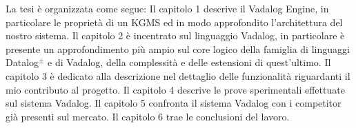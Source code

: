 La tesi è organizzata come segue: \newline \newline
Il capitolo 1 descrive il Vadalog Engine, in particolare le proprietà di un KGMS ed in modo approfondito l'architettura del nostro sistema. \newline \newline
Il capitolo 2 è incentrato sul linguaggio Vadalog, in particolare è presente un approfondimento più ampio sul core logico della famiglia di linguaggi Datalog$^\pm$ e di Vadalog, della complessità e delle estensioni di quest'ultimo. \newline \newline
Il capitolo 3 è dedicato alla descrizione nel dettaglio delle funzionalità riguardanti il mio contributo al progetto. \newline \newline
Il capitolo 4 descrive le prove sperimentali effettuate sul sistema Vadalog. \newline \newline
Il capitolo 5 confronta il sistema Vadalog con i competitor già presenti sul mercato. \newline \newline
Il capitolo 6 trae le conclusioni del lavoro.
